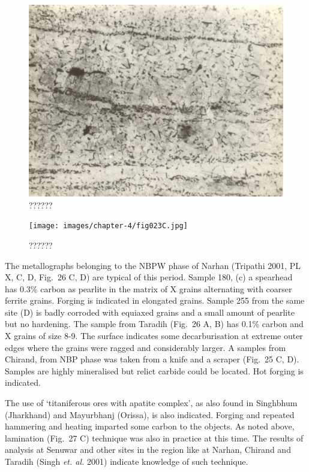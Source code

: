 \begin{figure}[H]
\renewcommand{\thefigure}{23B}
\includegraphics[scale=0.75]{images/chapter-4/fig023B.jpg}
\caption{??????}\label{chapter-4-fig23B}
\end{figure}

\begin{figure}[H]
\renewcommand{\thefigure}{23C}
\texttt{[image: images/chapter-4/fig023C.jpg]}
\caption{??????}\label{chapter-4-fig23C}
\end{figure}


\vspace{-.3cm}

The metallographs belonging to the NBPW phase of Narhan (Tripathi 2001, PL X, C, D, Fig.~26 C, D) are typical of this period. Sample 180, (c) a spearhead has 0.3\% carbon as pearlite in the matrix of X grains alternating with coarser ferrite grains. Forging is indicated in elongated grains. Sample 255 from the same site (D) is badly corroded with equiaxed grains and a small amount of pearlite but no hardening. The sample from Taradih (Fig.~26 A, B) has 0.1\% carbon and X grains of size 8-9. The surface indicates some decarburisation at extreme outer edges where the grains were ragged and considerably larger. A samples from Chirand, from NBP phase was taken from a knife and a scraper (Fig.~25 C, D). Samples are highly mineralised but relict carbide could be located. Hot forging is indicated.

The use of ‘titaniferous ores with apatite complex’, as also found in Singhbhum (Jharkhand) and Mayurbhanj (Orissa), is also indicated. Forging and repeated hammering and heating imparted some carbon to the objects. As noted above, lamination (Fig.~27 C) technique was also in practice at this time. The results of analysis at Senuwar and other sites in the region like at Narhan, Chirand and Taradih (Singh {\it et. al.} 2001) indicate knowledge of such technique. 


